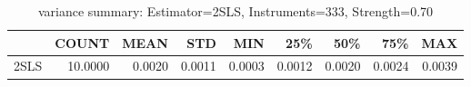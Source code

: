 \begin{table}[ht]
\centering
\caption{variance summary: Estimator=2SLS, Instruments=333, Strength=0.70}
\begin{tabular}{lrrrrrrrr}
\toprule
 & COUNT & MEAN & STD & MIN & 25\% & 50\% & 75\% & MAX \\
\midrule
2SLS & 10.0000 & 0.0020 & 0.0011 & 0.0003 & 0.0012 & 0.0020 & 0.0024 & 0.0039 \\
\bottomrule
\end{tabular}
\end{table}
